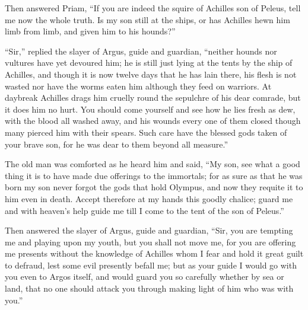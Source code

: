 Then answered Priam, “If you are indeed the squire of Achilles son of
Peleus, tell me now the whole truth. Is my son still at the ships, or has
Achilles hewn him limb from limb, and given him to his hounds?”

“Sir,” replied the slayer of Argus, guide and guardian, “neither hounds
nor vultures have yet devoured him; he is still just lying at the tents by
the ship of Achilles, and though it is now twelve days that he has lain
there, his flesh is not wasted nor have the worms eaten him although they
feed on warriors. At daybreak Achilles drags him cruelly round the
sepulchre of his dear comrade, but it does him no hurt. You should come
yourself and see how he lies fresh as dew, with the blood all washed away,
and his wounds every one of them closed though many pierced him with their
spears. Such care have the blessed gods taken of your brave son, for he
was dear to them beyond all measure.”

The old man was comforted as he heard him and said, “My son, see what a
good thing it is to have made due offerings to the immortals; for as sure
as that he was born my son never forgot the gods that hold Olympus, and
now they requite it to him even in death. Accept therefore at my hands
this goodly chalice; guard me and with heaven’s help guide me till I come
to the tent of the son of Peleus.”

Then answered the slayer of Argus, guide and guardian, “Sir, you are
tempting me and playing upon my youth, but you shall not move me, for you
are offering me presents without the knowledge of Achilles whom I fear and
hold it great guilt to defraud, lest some evil presently befall me; but as
your guide I would go with you even to Argos itself, and would guard you
so carefully whether by sea or land, that no one should attack you through
making light of him who was with you.”

